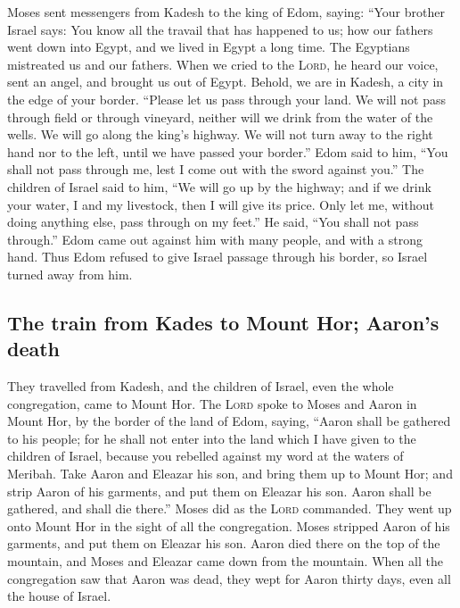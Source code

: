  Moses sent messengers from Kadesh to the king of Edom,
saying: ``Your brother Israel says: You know all the travail that has
happened to us;  how our fathers went down into Egypt,
and we lived in Egypt a long time. The Egyptians mistreated us and our
fathers.  When we cried to the \textsc{Lord}, he heard
our voice, sent an angel, and brought us out of Egypt. Behold, we are in
Kadesh, a city in the edge of your border.  ``Please let
us pass through your land. We will not pass through field or through
vineyard, neither will we drink from the water of the wells. We will go
along the king's highway. We will not turn away to the right hand nor to
the left, until we have passed your border.''  Edom said
to him, ``You shall not pass through me, lest I come out with the sword
against you.''  The children of Israel said to him, ``We
will go up by the highway; and if we drink your water, I and my
livestock, then I will give its price. Only let me, without doing
anything else, pass through on my feet.''  He said, ``You
shall not pass through.'' Edom came out against him with many people,
and with a strong hand.  Thus Edom refused to give Israel
passage through his border, so Israel turned away from him.

\hypertarget{the-train-from-kades-to-mount-hor-aarons-death}{%
\subsection{The train from Kades to Mount Hor; Aaron's
death}\label{the-train-from-kades-to-mount-hor-aarons-death}}

 They travelled from Kadesh, and the children of Israel,
even the whole congregation, came to Mount Hor.  The
\textsc{Lord} spoke to Moses and Aaron in Mount Hor, by the border of
the land of Edom, saying,  ``Aaron shall be gathered to
his people; for he shall not enter into the land which I have given to
the children of Israel, because you rebelled against my word at the
waters of Meribah.  Take Aaron and Eleazar his son, and
bring them up to Mount Hor;  and strip Aaron of his
garments, and put them on Eleazar his son. Aaron shall be gathered, and
shall die there.''  Moses did as the \textsc{Lord}
commanded. They went up onto Mount Hor in the sight of all the
congregation.  Moses stripped Aaron of his garments, and
put them on Eleazar his son. Aaron died there on the top of the
mountain, and Moses and Eleazar came down from the mountain.
 When all the congregation saw that Aaron was dead, they
wept for Aaron thirty days, even all the house of Israel.

